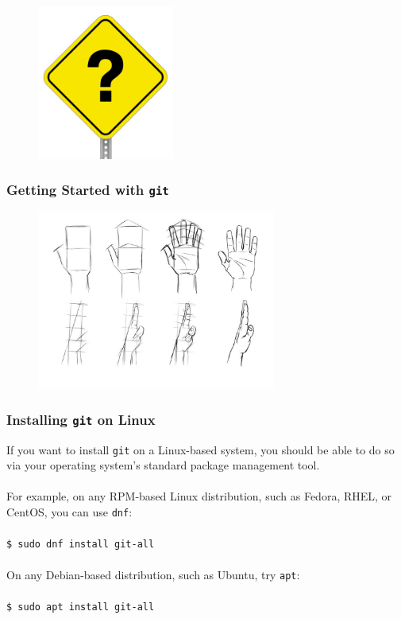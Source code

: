 \documentclass{beamer}
\begin{document}
\begin{frame}
   \frametitle{}
   \vspace{-1.0em}
   \begin{figure}[htbp]
      \includegraphics[width=0.4\textwidth]{images/question-mark-sign.jpg}
   \end{figure}
\end{frame}

\begin{frame}
   \frametitle{Getting Started with \texttt{git}}
   \begin{figure}[htbp]
      \includegraphics[width=0.7\textwidth]{images/hands-on-tutorial-by-masterss.jpg}
   \end{figure}
\end{frame}

\begin{frame}
   \frametitle{Installing \texttt{git} on Linux}
   If you want to install \texttt{git} on a Linux-based system, you 
   should be able to do so via your operating system's standard package
   management tool. 
   \\ \ \\
   For example, on any RPM-based Linux distribution, such as Fedora, 
   RHEL, or CentOS, you can use \texttt{dnf}: 
   \\ \ \\
   \hspace{1.0em}\texttt{\$ sudo dnf install git-all}
   \\ \ \\
   On any Debian-based distribution, such as Ubuntu, try \texttt{apt}: 
   \\ \ \\
   \hspace{1.0em}\texttt{\$ sudo apt install git-all} 
\end{frame}
\end{document}
